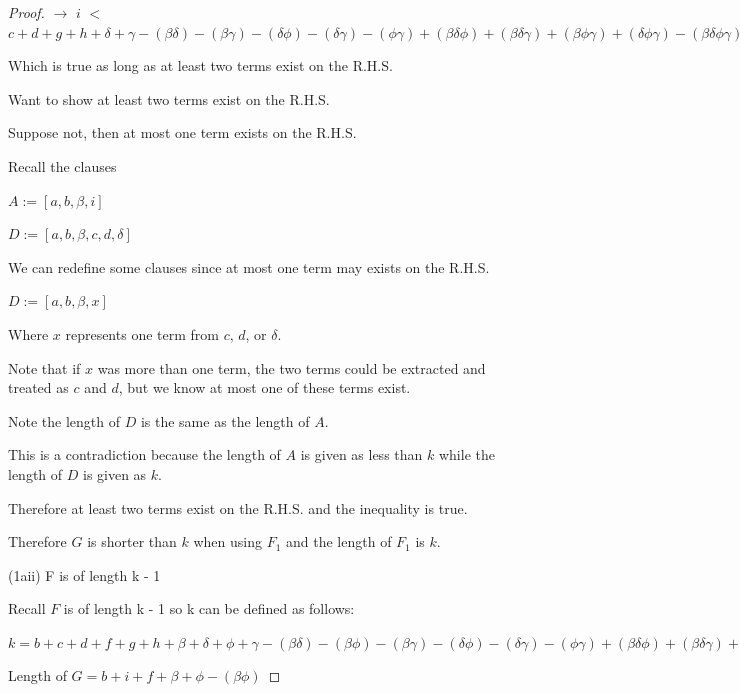 \documentclass[manuscript]{acmart}
\begin{document}
\begin{proof}
        $\rightarrow$ $i$
        $<$
        $c + d + g + h 
         + \delta + \gamma
        - (\beta \delta) - (\beta \gamma) - (\delta \phi) - (\delta \gamma) - (\phi \gamma)
        + (\beta \delta \phi) + (\beta \delta \gamma) + (\beta \phi \gamma) + (\delta \phi \gamma)
        - (\beta \delta \phi \gamma) 
        $

        Which is true as long as at least two terms exist on the R.H.S.

        Want to show at least two terms exist on the R.H.S.

        Suppose not, then at most one term exists on the R.H.S.

        Recall the clauses

        $A := [a, b, \beta, i]$

        $D := [a, b, \beta, c, d, \delta]$

        We can redefine some clauses since at most one term may exists on the R.H.S.

        $D := [a, b, \beta, x]$

        Where $x$ represents one term from $c$, $d$, or $\delta$.

        Note that if $x$ was more than one term, the two terms could be extracted and treated as $c$ and $d$, but we know at most one of these terms exist.
        
        Note the length of $D$ is the same as the length of $A$.

        This is a contradiction because the length of $A$ is given as less than $k$ while the length of $D$ is given as $k$.

        Therefore at least two terms exist on the R.H.S. and the inequality is true.

        Therefore $G$ is shorter than $k$ when using $F_1$ and the length of $F_1$ is $k$.

        (1aii) F is of length k - 1

        Recall $F$ is of length k - 1 so k can be defined as follows:
        
        $k = b + c + d + f + g + h 
        + \beta + \delta + \phi + \gamma
        - (\beta \delta) - (\beta \phi) - (\beta \gamma) - (\delta \phi) - (\delta \gamma) - (\phi \gamma)
        + (\beta \delta \phi) + (\beta \delta \gamma) + (\beta \phi \gamma) + (\delta \phi \gamma)
        - (\beta \delta \phi \gamma)
        + 1
        $

        Length of $G = b + i + f + \beta + \phi - (\beta \phi)$


\end{proof}
\end{document}
